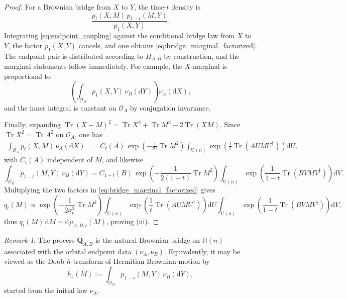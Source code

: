 \documentclass[11pt,a4paper]{article}
\theoremstyle{definition}\newtheorem{definition}[theorem]{Definition}
\theoremstyle{remark}\newtheorem{remark}[theorem]{Remark}
\numberwithin{equation}{section}
\DeclareMathOperator{\Tr}{Tr}
\newcommand{\dd}{\mathrm{d}}
\newcommand{\HH}{\mathbb{H}(n)}
\newcommand{\UU}{\mathrm{U}(n)}
\begin{document}
\begin{proof}
For a Brownian bridge from $X$ to $Y$, the time-$t$ density is
\begin{equation}
\frac{p_t(X,M)\,p_{1-t}(M,Y)}{p_1(X,Y)}.
\end{equation}
Integrating \eqref{eq:endpoint_coupling} against the conditional bridge law from
$X$ to $Y$, the factor $p_1(X,Y)$ cancels, and one obtains \eqref{eq:bridge_marginal_factorized}. The endpoint pair is distributed according to $\Pi_{A,B}$ by construction, and the marginal statements follow immediately. For example, the $X$-marginal is proportional to
\begin{equation}
\left(\int_{\mathcal O_B} p_1(X,Y)\,\nu_B(\dd Y)\right)\nu_A(\dd X),
\end{equation}
and the inner integral is constant on $\mathcal O_A$ by conjugation
invariance.

Finally, expanding $\Tr(X-M)^2=\Tr X^2+\Tr M^2-2\Tr(XM)$. Since $\Tr X^2=\Tr A^2$ on $\mathcal O_A$, one has
\begin{align*}
\int_{\mathcal O_A} p_t(X,M)\,\nu_A(\dd X)
&=
C_t(A)\,
\exp\!\left(-\frac{1}{2t}\Tr M^2\right)
\int_{\UU}\exp\!\left(\frac{1}{t}\Tr(AUMU^\dagger)\right)\dd U,
\end{align*}
with $C_t(A)$ independent of $M$, and likewise
\begin{equation*}
\int_{\mathcal O_B} p_{1-t}(M,Y)\,\nu_B(\dd Y)
=
C_{1-t}(B)\,
\exp\!\left(-\frac{1}{2(1-t)}\Tr M^2\right)
\int_{\UU}\exp\!\left(\frac{1}{1-t}\Tr(BVMV^\dagger)\right)\dd V.
\end{equation*}
Multiplying the two factors in \eqref{eq:bridge_marginal_factorized} gives
\begin{equation}
q_t(M)\propto
\exp\!\left(-\frac{1}{2\sigma_t^2}\Tr M^2\right)
\int_{\UU}\exp\!\left(\frac1t\Tr(AUMU^\dagger)\right)\dd U
\int_{\UU}\exp\!\left(\frac1{1-t}\Tr(BVMV^\dagger)\right)\dd V,
\end{equation}
thus \(q_t(M)\,\dd M=\dd\mu_{A,B,t}(M)\), proving \textup{(iii)}.
\end{proof}
\begin{remark}
\label{rem:Doob_bridge}
The process $\mathbf Q_{A,B}$ is the natural Brownian bridge on $\HH$
associated with the orbital endpoint data $(\nu_A,\nu_B)$. Equivalently, it may
be viewed as the Doob $h$-transform of Hermitian Brownian motion by
\begin{equation}
h_s(M):=\int_{\mathcal O_B} p_{1-s}(M,Y)\,\nu_B(\dd Y),
\end{equation}
started from the initial law $\nu_A$.
\end{remark}
\end{document}
